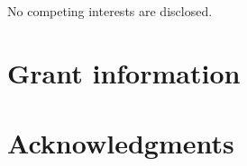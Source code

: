 \documentclass[12pt,a4paper]{extarticle}
\begin{document}
No competing interests are disclosed.

\section*{Grant information}

\section*{Acknowledgments}



\nocite{*}
{\small
}







\end{document}
